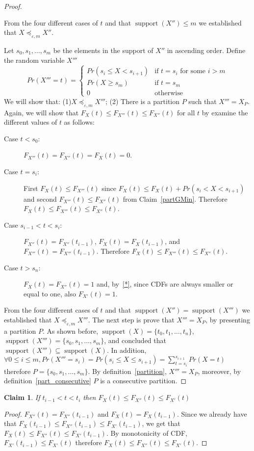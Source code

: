 \documentclass[review]{elsarticle}
\newtheorem{claim}{Claim}
\DeclareMathOperator{\supp}{support}
\DeclareMathOperator{\support}{support}
\begin{document}
\begin{proof}
\begin{description}
\end{description}
From the four different cases of $t$ and that $\supp(X'')\leq m$ we established that $X \preceq_{\varepsilon,m} X''$. 

Let $s_0,s_1,\dots,s_m$ be the elements in the support of $X''$ in ascending order. Define the random variable $X'''$
$$
Pr(X'''=t) = \begin{cases}
Pr(s_{i} \leq X < s_{i+1}) & \text{if } t=s_i \text{ for some } i > m \\ 
Pr(X \geq s_m)           & \text{if } t=s_m  \\ 
0                        & \text{otherwise}
\end{cases}
$$
We will show that: (1)$X \preceq_{\varepsilon,m} X'''$; (2) There is a partition $P$ such that $X'''=X_P$. 
Again, we will show that $F_{X}(t) \leq  F_{X'''}(t) \leq F_{X''}(t)$ for all $t$ by examine the different values of $t$ as follows: 
\begin{description}
\item[Case $t < s_0$:] $F_{X'''}(t)=F_{X''}(t)=F_{X}(t)=0$. 
\item[Case $t=s_i$:] First $F_{X}(t) \leq F_{X'''}(t)$ since $F_{X}(t) \leq F_{X}(t)+Pr(s_{i} < X < s_{i+1})$ 
and second $F_{X'''}(t) \leq F_{X''}(t)$  from Claim~\ref{partGMin}. Therefore $F_{X}(t) \leq F_{X'''}(t) \leq F_{X''}(t)$.
\item[Case $s_{i-1} < t < s_i$:] $F_{X''}(t)= F_{X''}(t_{i-1})$, $F_{X}(t)=F_{X}(t_{i-1})$, and $F_{X'''}(t)= F_{X'''}(t_{i-1})$. Therefore $F_{X}(t) \leq F_{X'''}(t) \leq F_{X''}(t)$.  
\item[Case $t > s_n$:] $F_{X}(t)= F_{X''}(t)=1$ and, by~\eqref{*}, since CDFs are always smaller or equal to one, also $F_{X'}(t)=1$.
\end{description}
From the four different cases of $t$ and that $\supp(X'')=\supp(X''')$ we established that $X \preceq_{\varepsilon,m} X'''$. 
The next step is prove that $X'''=X_P$, by presenting a partition $P$. As shown before, $\support(X)=\{t_0,t_1,\dots,t_n\}$,  $\support(X''')=\{s_0,s_1,\dots,s_m\}$, and concluded that $\support(X''')\subseteq \support(X)$. In addition, $\forall 0\leq i\leq m, Pr(X'''=s_i) = Pr(s_i \leq X \leq s_{i+1})=\sum^{s_{i+1}}_{t=s_i} Pr(X=t)$ therefore $P = \{s_0,s_1,\dots,s_m\}$.
By definition~\ref{partition}, $X'''=X_P$, moreover, by definition~\ref{part_consecutive} $P$ is a consecutive partition.
\end{proof}
\begin{claim}\label{suppGMin}
If $t_{i-1} < t < t_i$ then $F_{X}(t) \leq F_{X''}(t) \leq F_{X'}(t)$
\end{claim}
\begin{proof}
$F_{X''}(t)= F_{X''}(t_{i-1})$ and $F_{X}(t)=F_{X}(t_{i-1})$. Since we already have that $F_{X}(t_{i-1}) \leq F_{X''}(t_{i-1}) \leq F_{X'}(t_{i-1})$, we get that $F_{X}(t) \leq F_{X''}(t) \leq F_{X'}(t_{i-1})$. By monotonicity of CDF, $F_{X'}(t_{i-1}) \leq F_{X'}(t)$ therefore $F_{X}(t) \leq F_{X''}(t) \leq F_{X'}(t)$.
\end{proof}
\end{document}
